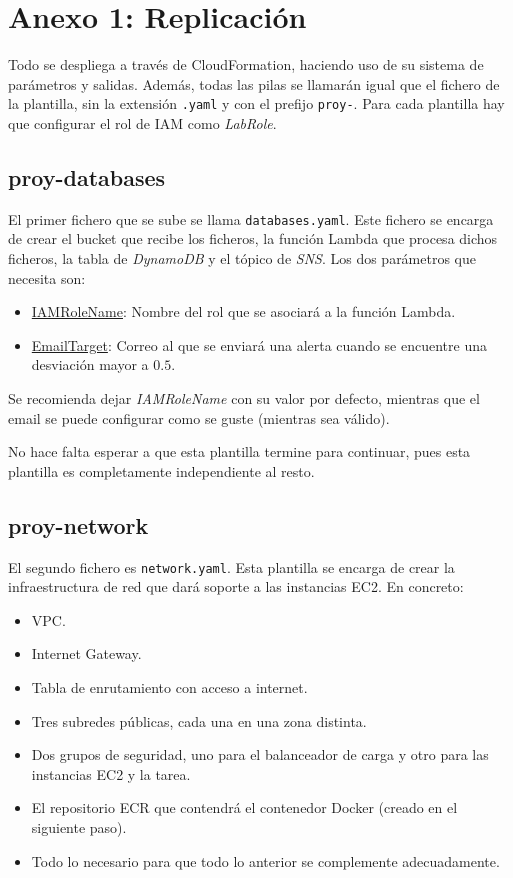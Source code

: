 \section{Anexo 1: Replicación}

Todo se despliega a través de CloudFormation, haciendo uso de su sistema de parámetros y salidas. Además, todas las pilas se llamarán igual que el fichero de la plantilla, sin la extensión \texttt{.yaml} y con el prefijo \texttt{proy-}. Para cada plantilla hay que configurar el rol de IAM como \textit{LabRole}.

\subsection{proy-databases}

El primer fichero que se sube se llama \texttt{databases.yaml}. Este fichero se encarga de crear el bucket que recibe los ficheros, la función Lambda que procesa dichos ficheros, la tabla de \textit{DynamoDB} y el tópico de \textit{SNS}. Los dos parámetros que necesita son:

\begin{itemize}
     \item \underline{IAMRoleName}: Nombre del rol que se asociará a la función Lambda.
     \item \underline{EmailTarget}: Correo al que se enviará una alerta cuando se encuentre una desviación mayor a $0.5$.
\end{itemize}

Se recomienda dejar \textit{IAMRoleName} con su valor por defecto, mientras que el email se puede configurar como se guste (mientras sea válido).

No hace falta esperar a que esta plantilla termine para continuar, pues esta plantilla es completamente independiente al resto.

\subsection{proy-network}

El segundo fichero es \texttt{network.yaml}. Esta plantilla se encarga de crear la infraestructura de red que dará soporte a las instancias EC2. En concreto:

\begin{itemize}
    \item VPC.
    \item Internet Gateway.
    \item Tabla de enrutamiento con acceso a internet.
    \item Tres subredes públicas, cada una en una zona distinta.
    \item Dos grupos de seguridad, uno para el balanceador de carga y otro para las instancias EC2 y la tarea.
    \item El repositorio ECR que contendrá el contenedor Docker (creado en el siguiente paso).
    \item Todo lo necesario para que todo lo anterior se complemente adecuadamente.
\end{itemize}

